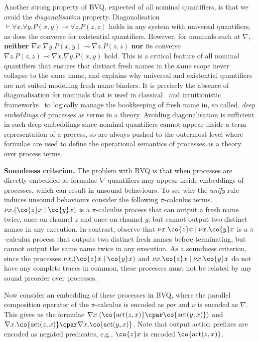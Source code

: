 \documentclass[UKenglish,acmsmall,authorversion]{acmart}
\theoremstyle{plain}
\begin{document}
Another strong property of \textsf{BVQ}, expected of all nominal quantifiers, is that we avoid the \textit{diagonalisation} property.
Diagonalisation $\vdash \forall x .\forall y .P(x,y) \multimap \forall z .P(z,z)$ holds in any system with universal quantifiers, as does the converse for existential quantifiers.
However, for nominals such at $\nabla$, \textbf{neither} $\nabla x .\nabla y .P(x,y) \multimap \nabla z .P(z,z)$ \textbf{nor} its converse $\nabla z .P(z,z) \multimap \nabla x .\nabla y .P(x,y)$ hold.
This is a critical feature of all nominal quantifiers that ensures that distinct fresh names in the same scope never collapse to the same name, and explains why universal and existential quantifiers are not suited modelling fresh name binders.
It is precisely the absence of diagonalisation for nominals that is used in classical~\cite{Pitts2003,Gabbay2002} and intuitionistic frameworks~\cite{Tiu2009,Gacek2011}
to logically manage the bookkeeping of fresh name in, so called, \textit{deep embeddings} of processes as terms in a theory.
Avoiding diagonalisation is sufficient in such deep embeddings since nominal quantifiers cannot appear inside a term representation of a process, so are always pushed to the outermost level where formulae are used to define the operational semantics of processes as a theory over process terms.

\textbf{Soundness criterion.}
The problem with \textsf{BVQ} is that when processes are directly embedded as formulae $\nabla$ quantifiers may appear inside embeddings of processes, which can result in unsound behaviours.
To see why the \textit{unify} rule induces unsound behaviours consider the following $\pi$-calculus terms. 
$\mathopen{\nu x.}(\co{z}x \mathrel{|} \co{y}x)$ is a $\pi$-calculus process that can output a fresh name twice, once on channel
$z$ and once on channel $y$; but cannot output two distinct names in any execution.
In contrast, observe that $\nu x.\co{z}x \mathrel{|} \nu x.\co{y}x$ is a $\pi$-calculus process that outputs
two distinct fresh names before terminating, but cannot output the same name twice in any execution.
As a soundness criterion, since the processes $\mathopen{\nu x.}(\co{z}x \mathrel{|} \co{y}x)$ and $\nu x.\co{z}x \mathrel{|} \nu x.\co{y}x$ do not have any complete traces in common, these processes must not be related by any sound preorder over processes.

Now consider an embedding of these processes in \textsf{BVQ}, where the parallel composition operator of the $\pi$-calculus is encoded as \emph{par} and $\nu$ is encoded as $\nabla$.
This gives us the formulae
$\mathopen{\nabla x.} \left(\co{\mathrm{act}(z, x)} \cpar \co{\mathrm{act}(y, x)}\right)$
and
$\nabla x.\co{\mathrm{act}(z, x)} \cpar \nabla x.\co{\mathrm{act}(y, x)}$.
Note that output action prefixes are encoded as negated predicates, e.g., $\co{z}x$ is
encoded $\co{\mathrm{act}(z,x)}$. 
\end{document}
